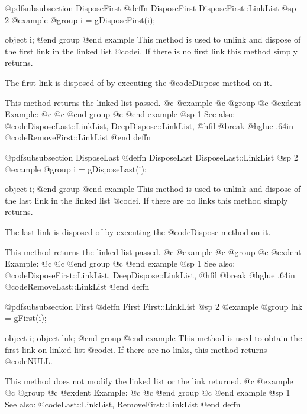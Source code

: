 @pdfsubsubsection {DisposeFirst}
@deffn {DisposeFirst} DisposeFirst::LinkList
@sp 2
@example
@group
i = gDisposeFirst(i);

object  i;
@end group
@end example
This method is used to unlink and dispose of the first link in the
linked list @code{i}.  If there is no first link this method simply
returns.

The first link is disposed of by executing the @code{Dispose}
method on it.

This method returns the linked list passed.
@c @example
@c @group
@c @exdent Example:
@c 
@c @end group
@c @end example
@sp 1
See also:  @code{DisposeLast::LinkList, DeepDispose::LinkList,}
@hfil @break @hglue .64in      @code{RemoveFirst::LinkList}
@end deffn










@pdfsubsubsection {DisposeLast}
@deffn {DisposeLast} DisposeLast::LinkList
@sp 2
@example
@group
i = gDisposeLast(i);

object  i;
@end group
@end example
This method is used to unlink and dispose of the last link in the
linked list @code{i}.  If there are no links this method simply
returns.

The last link is disposed of by executing the @code{Dispose}
method on it.

This method returns the linked list passed.
@c @example
@c @group
@c @exdent Example:
@c 
@c @end group
@c @end example
@sp 1
See also:  @code{DisposeFirst::LinkList, DeepDispose::LinkList,}
@hfil @break @hglue .64in      @code{RemoveLast::LinkList}
@end deffn










@pdfsubsubsection {First}
@deffn {First} First::LinkList
@sp 2
@example
@group
lnk = gFirst(i);

object  i;
object  lnk;
@end group
@end example
This method is used to obtain the first link on linked list @code{i}.
If there are no links, this method returns @code{NULL}.

This method does not modify the linked list or the link returned.
@c @example
@c @group
@c @exdent Example:
@c 
@c @end group
@c @end example
@sp 1
See also:  @code{Last::LinkList, RemoveFirst::LinkList}
@end deffn











